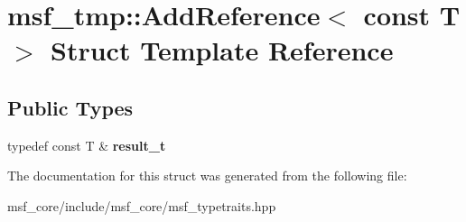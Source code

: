 \hypertarget{structmsf__tmp_1_1AddReference_3_01const_01T_01_4}{\section{msf\-\_\-tmp\-:\-:Add\-Reference$<$ const T $>$ Struct Template Reference}
\label{structmsf__tmp_1_1AddReference_3_01const_01T_01_4}
}
\subsection*{Public Types}
\begin{DoxyCompactItemize}
\item 
\hypertarget{structmsf__tmp_1_1AddReference_3_01const_01T_01_4_a61dd4d81003c295d665d8eac16795c10}{typedef const T \& {\bfseries result\-\_\-t}}\label{structmsf__tmp_1_1AddReference_3_01const_01T_01_4_a61dd4d81003c295d665d8eac16795c10}

\end{DoxyCompactItemize}


The documentation for this struct was generated from the following file\-:\begin{DoxyCompactItemize}
\item 
msf\-\_\-core/include/msf\-\_\-core/msf\-\_\-typetraits.\-hpp\end{DoxyCompactItemize}
